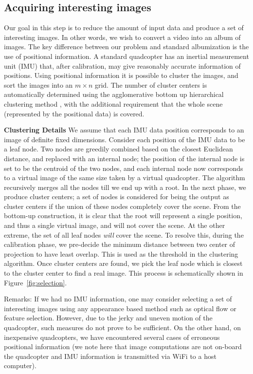 \subsection{Acquiring interesting images}
\label{sec:selection}
Our goal in this step is to reduce the amount of input data and
produce a set of interesting images.  In other words, we wish to
convert a video into an album of images.  The key difference between
our problem and standard albumization \cite{Aner, Lee} is the use of
positional information.  A standard quadcopter has an inertial
measurement unit (IMU) that, after calibration, may give reasonably
accurate information of positions. Using positional information it is
possible to cluster the images, and sort the images into an $m\times
n$ grid.  The number of cluster centers is automatically determined
using the agglomerative bottom up hierarchical clustering method
\cite{Lior}, with the additional requirement that the whole scene
(represented by the positional data) is covered.

{\bf Clustering Details} We assume that each IMU data position
corresponds to an image of definite fixed dimensions.  Consider each
position of the IMU data to be a leaf node. Two nodes are greedily
combined based on the closest Euclidean distance, and replaced with an
internal node; the position of the internal node is set to be the
centroid of the two nodes, and each internal node now corresponds to a
virtual image of the same size taken by a virtual quadcopter.  The
algorithm recursively merges all the nodes till we end up with a root.
In the next phase, we produce cluster centers; a set of nodes is
considered for being the output as cluster centers if the union of
these nodes completely cover the scene. From the bottom-up
construction, it is clear that the root will represent a single
position, and thus a single virtual image, and will not cover the
scene.  At the other extreme, the set of all leaf nodes \emph{will}
cover the scene. To resolve this, during the calibration phase, we
pre-decide the minimum distance between two center of projection to
have least overlap. This is used as the threshold in the clustering
algorithm.  Once cluster centers are found, we pick the leaf node
which is closest to the cluster center to find a real image. This
process is schematically shown in Figure~\ref{fig:selection}.

Remarks: If we had no IMU information, one may consider selecting a
set of interesting images using any appearance based method such as
optical flow or feature selection.  However, due to the jerky and
uneven motion of the quadcopter, such measures do not prove to be
sufficient. On the other hand, on inexpensive quadcopters, we have
encountered several cases of erroneous positional information (we note
here that image computations are not on-board the quadcopter and IMU
information is transmitted via WiFi to a host computer).  


